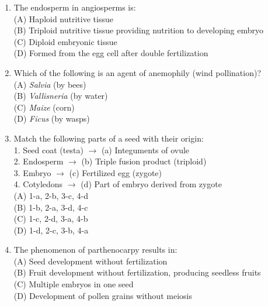 \documentclass{article}
\begin{document}
\begin{enumerate}[label=Q\arabic*.]
\item The endosperm in angiosperms is:
\\(A) Haploid nutritive tissue
\\(B) Triploid nutritive tissue providing nutrition to developing embryo
\\(C) Diploid embryonic tissue
\\(D) Formed from the egg cell after double fertilization

\item Which of the following is an agent of anemophily (wind pollination)?
\\(A) \textit{Salvia} (by bees)
\\(B) \textit{Vallisneria} (by water)
\\(C) \textit{Maize} (corn)
\\(D) \textit{Ficus} (by wasps)

\item Match the following parts of a seed with their origin:\\
1. Seed coat (testa) $\rightarrow$ (a) Integuments of ovule\\
2. Endosperm $\rightarrow$ (b) Triple fusion product (triploid)\\
3. Embryo $\rightarrow$ (c) Fertilized egg (zygote)\\
4. Cotyledons $\rightarrow$ (d) Part of embryo derived from zygote
\\(A) 1-a, 2-b, 3-c, 4-d
\\(B) 1-b, 2-a, 3-d, 4-c
\\(C) 1-c, 2-d, 3-a, 4-b
\\(D) 1-d, 2-c, 3-b, 4-a

\item The phenomenon of parthenocarpy results in:
\\(A) Seed development without fertilization
\\(B) Fruit development without fertilization, producing seedless fruits
\\(C) Multiple embryos in one seed
\\(D) Development of pollen grains without meiosis

\end{enumerate}
\end{document}
